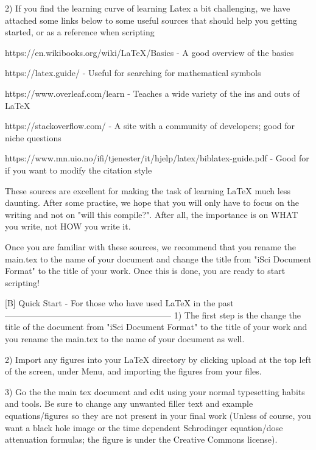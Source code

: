     2) If you find the learning curve of learning Latex
    a bit challenging, we have attached some links below
    to some useful sources that should help you getting 
    started, or as a reference when scripting
    
    https://en.wikibooks.org/wiki/LaTeX/Basics - A good overview of the basics
    
    https://latex.guide/ - Useful for searching for mathematical symbols
    
    https://www.overleaf.com/learn - Teaches a wide variety of the ins and outs of LaTeX
    
    https://stackoverflow.com/ - A site with a community of developers; good for niche questions
    
    https://www.mn.uio.no/ifi/tjenester/it/hjelp/latex/biblatex-guide.pdf - Good for if you want to modify the citation style
    
    These sources are excellent for making the task of
    learning LaTeX much less daunting. After some practise,
    we hope that you will only have to focus on the writing
    and not on "will this compile?". After all, the importance
    is on WHAT you write, not HOW you write it.
    
    Once you are familiar with these sources, we recommend that 
    you rename the main.tex to the name of your document and 
    change the title from "iSci Document Format" to the title 
    of your work. Once this is done, you are ready to start
    scripting!
    
[B] Quick Start - For those who have used LaTeX in the past
-----------------------------------------------------------
    1) The first step is the change the title of the 
    document from "iSci Document Format" to the title 
    of your work and you rename the main.tex to the 
    name of your document as well.
    
    2) Import any figures into your LaTeX directory by
    clicking upload at the top left of the screen, under
    Menu, and importing the figures from your files.
    
    3) Go the the main tex document and edit using your
    normal typesetting habits and tools. Be sure to change
    any unwanted filler text and example equations/figures
    so they are not present in your final work (Unless of 
    course, you want a black hole image or the time dependent 
    Schrodinger equation/dose attenuation formulas; the figure
    is under the Creative Commons license).
    
